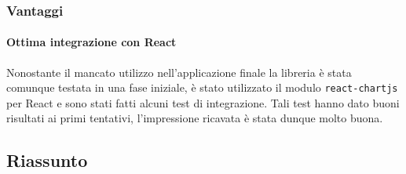 \subsubsection{Vantaggi}

\paragraph{Ottima integrazione con React}
Nonostante il mancato utilizzo nell'applicazione finale la libreria è stata comunque
testata in una fase iniziale, è stato utilizzato il modulo \texttt{react-chartjs} per
React e sono stati fatti alcuni test di integrazione. Tali test hanno dato buoni
risultati ai primi tentativi, l'impressione ricavata è stata dunque molto buona.

\subsection{Riassunto}

